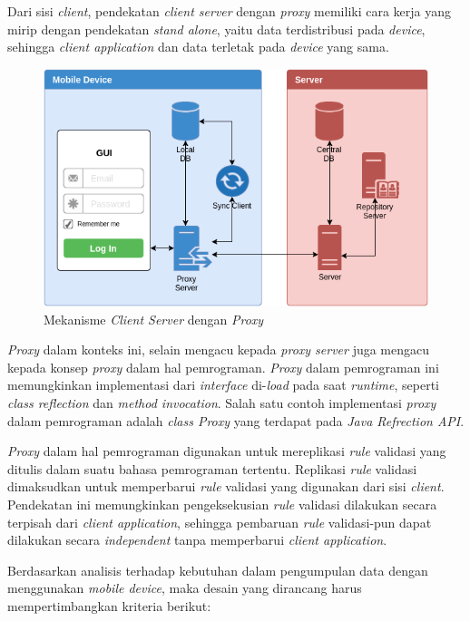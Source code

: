 Dari sisi \textit{client}, pendekatan \textit{client server} dengan \textit{proxy} memiliki cara kerja yang mirip dengan pendekatan \textit{stand alone}, yaitu data terdistribusi pada \textit{device}, sehingga \textit{client application} dan data terletak pada \textit{device} yang sama.

\begin{figure}[h]
    \centering
    \includegraphics[width=.8\textwidth]{../../Resources/Images/design-client-server-proxy}
    \caption{Mekanisme \textit{Client Server} dengan \textit{Proxy}}
    \label{fig:design-client-server-proxy}
\end{figure}

\textit{Proxy} dalam konteks ini, selain mengacu kepada \textit{proxy server} juga mengacu kepada konsep \textit{proxy} dalam hal pemrograman. \textit{Proxy} dalam pemrograman ini memungkinkan implementasi dari \textit{interface} di-\textit{load} pada saat \textit{runtime}, seperti \textit{class reflection} dan \textit{method invocation}. Salah satu contoh implementasi \textit{proxy} dalam pemrograman adalah \textit{class Proxy} yang terdapat pada \textit{Java Refrection API}.


\textit{Proxy} dalam hal pemrograman digunakan untuk mereplikasi \textit{rule} validasi yang ditulis dalam suatu bahasa pemrograman tertentu. Replikasi \textit{rule} validasi dimaksudkan untuk memperbarui \textit{rule} validasi yang digunakan dari sisi \textit{client}. Pendekatan ini memungkinkan pengeksekusian \textit{rule} validasi dilakukan secara terpisah dari \textit{client application}, sehingga pembaruan \textit{rule} validasi-pun dapat dilakukan secara \textit{independent} tanpa memperbarui \textit{client application}.


Berdasarkan analisis terhadap kebutuhan dalam pengumpulan data dengan menggunakan \textit{mobile device}, maka desain yang dirancang harus mempertimbangkan kriteria berikut:

